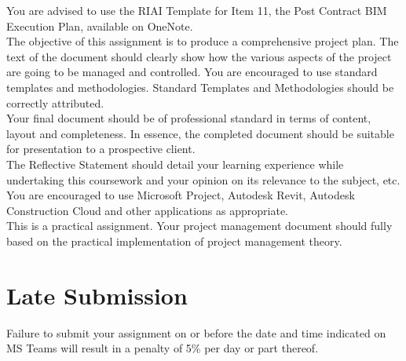 You are advised to use the RIAI Template for Item 11, the Post Contract BIM Execution Plan, available on OneNote.\\

The objective of this assignment is to produce a comprehensive project plan. The text of the document should clearly show how the various aspects of the project are going to be managed and controlled. You are encouraged to use standard templates and methodologies.  Standard Templates and Methodologies should be correctly attributed.\\

Your final document should be of professional standard in terms of content, layout and completeness. In essence, the completed document should be suitable for presentation to a prospective client.\\

The Reflective Statement should detail your learning experience while undertaking this coursework and your opinion on its relevance to the subject, etc.\\

You are encouraged to use Microsoft Project, Autodesk Revit, Autodesk Construction Cloud and other applications as appropriate.\\

This is a practical assignment. Your project management document should fully based on the practical implementation of project management theory.\\


\section*{Late Submission}
Failure to submit your assignment on or before the date and time indicated on MS Teams will result in a penalty of 5\% per day or part thereof.


\newpage

